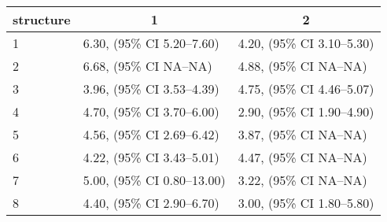 \begin{table}[!tbp]
\begin{center}
\begin{tabular}{lll}
\hline\hline
\multicolumn{1}{l}{structure}&\multicolumn{1}{c}{1}&\multicolumn{1}{c}{2}\tabularnewline
\hline
1&6.30, (95\% CI 5.20–7.60)&4.20, (95\% CI 3.10–5.30)\tabularnewline
2&6.68, (95\% CI NA–NA)&4.88, (95\% CI NA–NA)\tabularnewline
3&3.96, (95\% CI 3.53–4.39)&4.75, (95\% CI 4.46–5.07)\tabularnewline
4&4.70, (95\% CI 3.70–6.00)&2.90, (95\% CI 1.90–4.90)\tabularnewline
5&4.56, (95\% CI 2.69–6.42)&3.87, (95\% CI NA–NA)\tabularnewline
6&4.22, (95\% CI 3.43–5.01)&4.47, (95\% CI NA–NA)\tabularnewline
7&5.00, (95\% CI 0.80–13.00)&3.22, (95\% CI NA–NA)\tabularnewline
8&4.40, (95\% CI 2.90–6.70)&3.00, (95\% CI 1.80–5.80)\tabularnewline
\hline
\end{tabular}\end{center}
\end{table}
